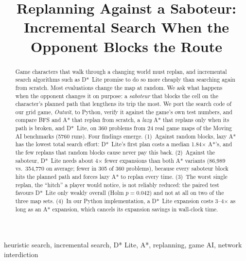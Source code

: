 \documentclass[conference,12pt]{IEEEtran}
\newcommand{\dstar}{D*~Lite}
\begin{document}
\title{Replanning Against a Saboteur: Incremental Search When the Opponent Blocks the Route}

\author{
}

\maketitle

\begin{abstract}
Game characters that walk through a changing world must replan, and incremental
search algorithms such as \dstar{} promise to do so more cheaply than searching again from
scratch. Most evaluations change the map at random. We ask what happens when the opponent
changes it on purpose: a \emph{saboteur} that blocks the cell on the character's planned path
that lengthens its trip the most. We port the search code of our grid game, \emph{Outwit}, to
Python, verify it against the game's own test numbers, and compare BFS and A* that replan from
scratch, a \emph{lazy} A* that replans only when its path is broken, and \dstar{}, on 360
problems from 24 real game maps of the Moving AI benchmarks (5760 runs). Four findings emerge.
(1)~Against random blocks, lazy A* has the lowest total search effort: \dstar{}'s first plan
costs a median 1.84$\times$ A*'s, and the few replans that random blocks cause never pay this
back. (2)~Against the saboteur, \dstar{} needs about 4$\times$ fewer expansions than both A*
variants (86{,}989 vs.\ 354{,}770 on average; fewer in 305 of 360 problems), because every
saboteur block hits the planned path and forces lazy A* to replan every time. (3)~The worst
single replan, the ``hitch'' a player would notice, is not reliably reduced: the paired test
favours \dstar{} only weakly overall (Holm $p=0.042$) and not at all on two of the three map
sets. (4)~In our Python implementation, a \dstar{} expansion costs 3--4$\times$ as long as an A*
expansion, which cancels its expansion savings in wall-clock time.
\end{abstract}

\begin{IEEEkeywords}
heuristic search, incremental search, D* Lite, A*, replanning, game AI, network interdiction
\end{IEEEkeywords}
\end{document}
